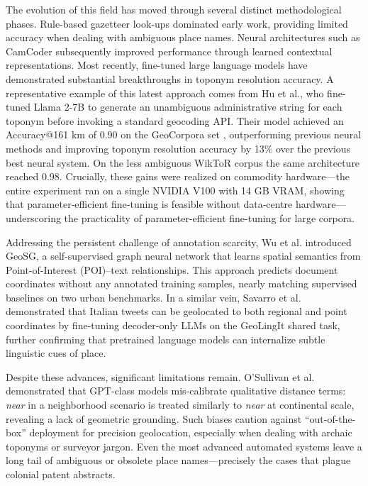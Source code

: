 The evolution of this field has moved through several distinct
methodological phases. Rule-based gazetteer look-ups dominated early
work, providing limited accuracy when dealing with ambiguous place
names. Neural architectures such as CamCoder \citep{Gritta2018_camcoder}
subsequently improved performance through learned contextual
representations. Most recently, fine-tuned large language models have
demonstrated substantial breakthroughs in toponym resolution accuracy. A
representative example of this latest approach comes from Hu et
al.\DIFaddbegin \DIFadd{~}\DIFaddend \citep{Hu2024_toponym_llm}, who fine-tuned Llama 2-7B to generate an
unambiguous administrative string for each toponym before invoking a
standard geocoding API. Their model achieved an Accuracy@161 km of 0.90
on the GeoCorpora set \DIFaddbegin {}\DIFaddend , outperforming
previous neural methods and improving toponym resolution accuracy by
13\% over the previous best neural system. On the less ambiguous WikToR
corpus \DIFaddbegin {}\DIFaddend the same architecture reached
0.98. Crucially, these gains were realized on commodity hardware---the
entire experiment ran on a single NVIDIA V100 with 14 GB VRAM, showing
that parameter‑efficient fine‑tuning is feasible without data‑centre
hardware---underscoring the practicality of parameter-efficient
fine-tuning for large corpora.

Addressing the persistent challenge of annotation scarcity, Wu et
al.\DIFaddbegin \DIFadd{~}\DIFaddend \citep{wu2025geosg} introduced GeoSG, a self-supervised graph neural
network that learns spatial semantics from Point-of-Interest (POI)--text
relationships. This approach predicts document coordinates without any
annotated training samples, nearly matching supervised baselines on two
urban benchmarks. In a similar vein, Savarro et
al.\DIFaddbegin \DIFadd{~}\DIFaddend \citep{savarro2024geolingit} demonstrated that Italian tweets can be
geolocated to both regional and point coordinates by fine-tuning
decoder-only LLMs on the GeoLingIt shared task, further confirming that
pretrained language models can internalize subtle linguistic cues of
place.

Despite these advances, significant limitations remain. O'Sullivan et
al.\DIFaddbegin \DIFadd{~}\DIFaddend \citep{Osullivan2024_metric} demonstrated that GPT-class models
mis-calibrate qualitative distance terms: \emph{near} in a neighborhood
scenario is treated similarly to \emph{near} at continental scale,
revealing a lack of geometric grounding. Such biases caution against
``out-of-the-box'' deployment for precision geolocation, especially when
dealing with archaic toponyms or surveyor jargon. Even the most advanced
automated systems leave a long tail of ambiguous or obsolete place
names---precisely the cases that plague colonial patent abstracts.

